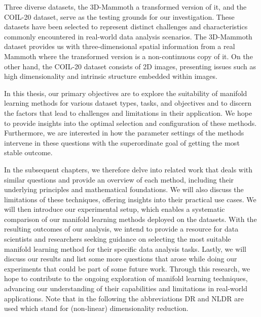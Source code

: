 Three diverse datasets, the 3D-Mammoth a transformed version of it, and the COIL-20 dataset, serve as the testing grounds for our investigation. These datasets have been selected to represent distinct challenges and characteristics commonly encountered in real-world data analysis scenarios. The 3D-Mammoth dataset provides us with three-dimensional spatial information from a real Mammoth where the transformed version is a non-continuous copy of it. On the other hand, the COIL-20 dataset consists of 2D images, presenting issues such as high dimensionality and intrinsic structure embedded within images.

In this thesis, our primary objectives are to explore the suitability of manifold learning methods for various dataset types, tasks, and objectives and to discern the factors that lead to challenges and limitations in their application. We hope to provide insights into the optimal selection and configuration of these methods. Furthermore, we are interested in how the parameter settings of the methods intervene in these questions with the superordinate goal of getting the most stable outcome.

In the subsequent chapters, we therefore delve into related work that deals with similar questions and provide an overview of each method, including their underlying principles and mathematical foundations. We will also discuss the limitations of these techniques, offering insights into their practical use cases. We will then introduce our experimental setup, which enables a systematic comparison of our manifold learning methods deployed on the datasets. With the resulting outcomes of our analysis, we intend to provide a resource for data scientists and researchers seeking guidance on selecting the most suitable manifold learning method for their specific data analysis tasks. Lastly, we will discuss our results and list some more questions that arose while doing our experiments that could be part of some future work. Through this research, we hope to contribute to the ongoing exploration of manifold learning techniques, advancing our understanding of their capabilities and limitations in real-world applications. Note that in the following the abbreviations DR and NLDR are used which stand for (non-linear) dimensionality reduction.
